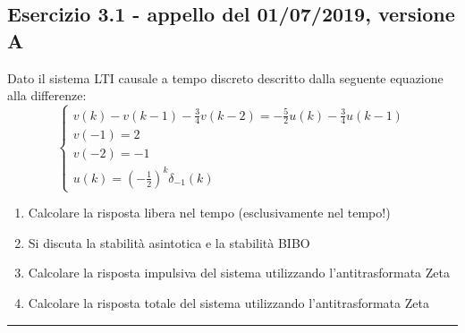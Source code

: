 \documentclass[12pt,a4paper]{article}
\begin{document}
	\subsection*{Esercizio 3.1 - appello del 01/07/2019, versione A}
	Dato il sistema LTI causale a tempo discreto descritto dalla seguente equazione alla differenze:
	\[
		\begin{cases}
		v(k) - v(k-1) -\frac{3}{4}v(k-2) = -\frac{5}{2}u(k) - \frac{3}{4}u(k-1)\\
		v(-1) = 2\\
		v(-2) = -1\\
		u(k) = \left(-\frac{1}{2}\right)^k\delta_{-1}(k)
		\end{cases}
	\]
	\begin{enumerate}
	\item Calcolare la risposta libera nel tempo (esclusivamente nel tempo!)
	\item Si discuta la stabilit\`a asintotica e la stabilit\`a BIBO
	\item Calcolare la risposta impulsiva del sistema utilizzando l'antitrasformata Zeta
	\item Calcolare la risposta totale del sistema utilizzando l'antitrasformata Zeta
	\end{enumerate}
	\par\noindent\rule{\textwidth}{0.4pt}
\end{document}
